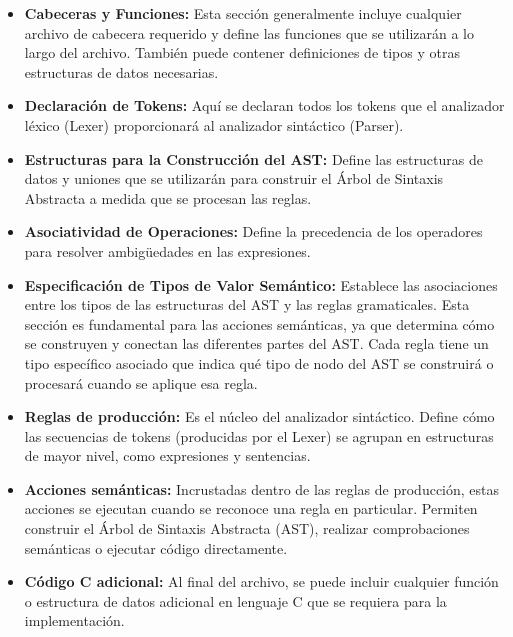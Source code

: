\begin{itemize}
    \item \textbf{Cabeceras y Funciones:} Esta sección generalmente incluye cualquier archivo de cabecera requerido y define las funciones que se utilizarán a lo largo del archivo. También puede contener definiciones de tipos y otras estructuras de datos necesarias.
    
    \item \textbf{Declaración de Tokens:} Aquí se declaran todos los tokens que el analizador léxico (Lexer) proporcionará al analizador sintáctico (Parser).

    \item \textbf{Estructuras para la Construcción del AST:} Define las estructuras de datos y uniones que se utilizarán para construir el Árbol de Sintaxis Abstracta a medida que se procesan las reglas.

    \item \textbf{Asociatividad de Operaciones:} Define la precedencia de los operadores para resolver ambigüedades en las expresiones.

    \item \textbf{Especificación de Tipos de Valor Semántico:} Establece las asociaciones entre los tipos de las estructuras del AST y las reglas gramaticales. Esta sección es fundamental para las acciones semánticas, ya que determina cómo se construyen y conectan las diferentes partes del AST. Cada regla tiene un tipo específico asociado que indica qué tipo de nodo del AST se construirá o procesará cuando se aplique esa regla.

    \item \textbf{Reglas de producción:} Es el núcleo del analizador sintáctico. Define cómo las secuencias de tokens (producidas por el Lexer) se agrupan en estructuras de mayor nivel, como expresiones y sentencias.
    
    \item \textbf{Acciones semánticas:} Incrustadas dentro de las reglas de producción, estas acciones se ejecutan cuando se reconoce una regla en particular. Permiten construir el Árbol de Sintaxis Abstracta (AST), realizar comprobaciones semánticas o ejecutar código directamente.
    
    \item \textbf{Código C adicional:} Al final del archivo, se puede incluir cualquier función o estructura de datos adicional en lenguaje C que se requiera para la implementación.
\end{itemize}

